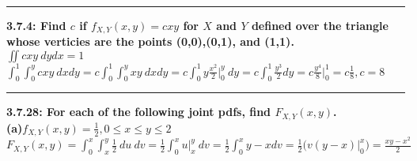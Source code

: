 \documentclass[11pt]{article}
\newcommand\question[2]{\vspace{.25in}\hrule\textbf{#1: #2}\vspace{.5em}\vspace{.10in}}
\renewcommand\part[1]{\vspace{.10in}\textbf{(#1)}}
\begin{document}
\raggedright
\newcommand\NAME{Jonathan Lopez}  %
\newcommand\HWNUM{5}              %



\question{3.7.4}
{Find $c$ if $f_{X,Y}(x,y) = cxy$ for $X$ and $Y$ defined over the triangle whose
verticies are the points (0,0),(0,1), and (1,1).}
\\
$
\iint cxy\ dydx = 1
$
\\
$
\int_{0}^{1} \int_{0}^{y} cxy\ dxdy
=
c \int_{0}^{1} \int_{0}^{y} xy\ dxdy
=
c \int_{0}^{1} y\frac{x^{2}}{2} \big |_{0}^{y} \ dy
=
c \int_{0}^{1} \frac{y^3}{2} dy
=
c \frac{y^4}{8} \big |_{0}^{1}
=
c\frac{1}{8}, c=8
$


% 



\question{3.7.28}
{For each of the following joint pdfs, find $F_{X,Y}(x,y)$.}
\\

\part{a}{$f_{X,Y}(x,y) = \frac{1}{2},0 \leq x \leq y \leq 2$}
\\
$
F_{X,Y}(x,y)
=
\int_{0}^{x} \int_{x}^{y} \frac{1}{2} \ du \ dv
=
\frac{1}{2}\int_{0}^{x} u \big |_{x}^{y}\ dv
=
\frac{1}{2}\int_{0}^{x} y-x dv
=
\frac{1}{2} \big ( v(y-x)\big |_{0}^{x} \big )
=
\frac{xy-x^{2}}{2}
$
\\
\end{document}
